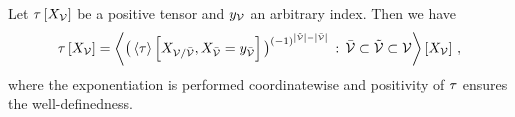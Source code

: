 \begin{lemma}
    \label{the:contractionFactorization}
    Let $\tau\left[X_{\mathcal{V}}\right]$ be a positive tensor and $y_{\mathcal{V}}$ an arbitrary index.
    Then we have
    \begin{align*}
        \tau\left[X_{\mathcal{V}}\right]
        = \left\langle 
            \big(\left\langle \tau\right\rangle \left[ X_{\mathcal{V}/\bar{\mathcal{V}}}, X_{\bar{\mathcal{V}}} = y_{\bar{\mathcal{V}}} \right]\big)^{(-1)^{\left|\tilde{\mathcal{V}}\right|-\left|\bar{\mathcal{V}}\right|}} \,:\, \bar{\mathcal{V}} \subset \tilde{\mathcal{V}} \subset \mathcal{V}
        \right\rangle \left[ X_{\mathcal{V}} \right] \, ,
    \end{align*}
    where the exponentiation is performed coordinatewise and positivity of $\tau$ ensures the well-definedness.
\end{lemma}
